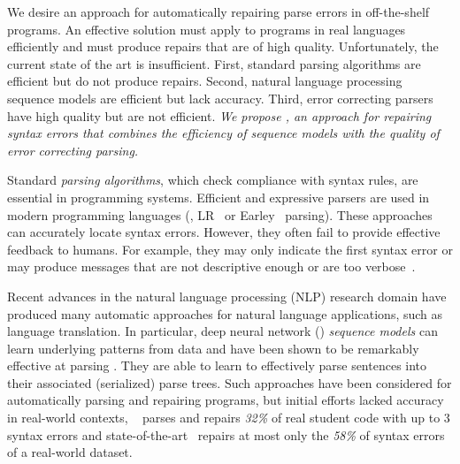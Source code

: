 We desire an approach for automatically repairing parse errors in off-the-shelf
programs. An effective solution must apply to programs in real languages
efficiently and must produce repairs that are of high quality. Unfortunately,
the current state of the art is insufficient. First, standard parsing algorithms
are efficient but do not produce repairs. Second, natural language processing
sequence models are efficient but lack accuracy. Third, error correcting parsers
have high quality but are not efficient. \emph{We propose \toolname, an approach
for repairing syntax errors that combines the efficiency of sequence models with
the quality of error correcting parsing.}

Standard \emph{parsing algorithms}, which check compliance with syntax rules,
are essential in programming systems. Efficient and expressive parsers are used
in modern programming languages (\eg, LR~\citep{Aho1974} or
Earley~\citep{Earley_1970} parsing). These approaches can accurately locate
syntax errors. However, they often fail to provide effective feedback to humans.
For example, they may only indicate the first syntax error or may produce
messages that are not descriptive enough or are too
verbose~\citep{Kummerfeld2003, Ahadi_2018, VanDerSpek_2005}.
%

Recent advances in the natural language processing (NLP) research domain
\citep{Sutskever_2014, Hardalov_2018} have produced many automatic approaches
for natural language applications, such as language translation. In particular,
deep neural network (\dnn) \emph{sequence models} can learn underlying patterns
from data and have been shown to be remarkably effective at parsing
\citep{Vinyals2015}. They are able to learn to effectively parse sentences into
their associated (serialized) parse trees. Such approaches have been considered
for automatically parsing and repairing programs, but initial efforts lacked
accuracy in real-world contexts, \eg~\citep{Ahmed_2021} parses and repairs
\emph{32\%} of real student code with up to 3 syntax errors and
state-of-the-art~\citep{Wu2020} repairs at most only the \emph{58\%} of syntax
errors of a real-world dataset.

